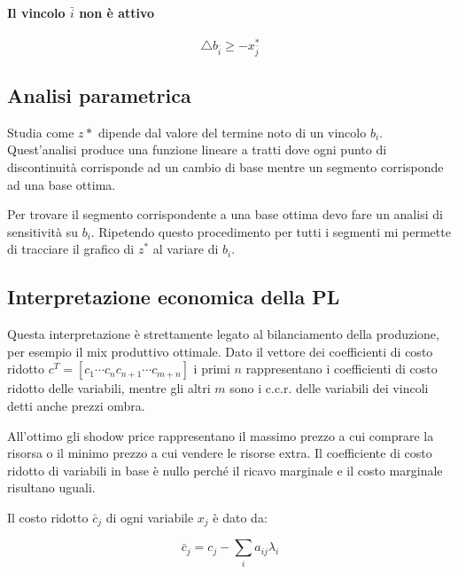 \paragraph{Il vincolo $\bar{i}$ non è attivo}

\begin{equation}
	\triangle b_{\bar{i}} \geq -x_{\bar{j}}^*
\end{equation}

\subsection{Analisi parametrica}
Studia come $z*$ dipende dal valore del termine noto di un vincolo $b_i$.
Quest'analisi produce una funzione lineare a tratti dove ogni punto di discontinuità corrisponde ad un cambio di base mentre un segmento corrisponde ad una base ottima.

Per trovare il segmento corrispondente a una base ottima devo fare un analisi di sensitività su $b_i$. Ripetendo questo procedimento per tutti i segmenti mi permette di tracciare il grafico di $z^*$ al variare di $b_i$.

\subsection{Interpretazione economica della PL}
Questa interpretazione è strettamente legato al bilanciamento della produzione, per esempio il mix produttivo ottimale.
Dato il vettore dei coefficienti di costo ridotto $c^T = [ c_1 \dotsm c_n c_{n+1} \dotsm c_{m+n} ]$ i primi $n$ rappresentano i coefficienti di costo ridotto delle variabili, mentre gli altri $m$ sono i c.c.r. delle variabili dei vincoli detti anche prezzi ombra.

All'ottimo gli shodow price rappresentano il massimo prezzo a cui comprare la risorsa o il minimo prezzo a cui vendere le risorse extra. 
Il coefficiente di costo ridotto di variabili in base è nullo perché il ricavo marginale e il costo marginale risultano uguali.

Il costo ridotto $\bar{c}_j$ di ogni variabile $x_j$ è dato da:

\begin{equation} \label{costoRidotto}
	\bar{c}_j = c_j - \sum_i a_{ij} \lambda_i
\end{equation}
